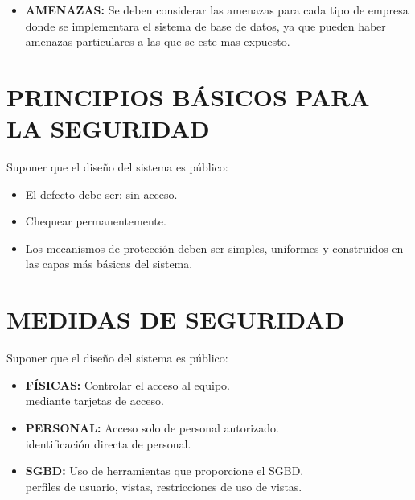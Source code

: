 \documentclass[conference]{IEEEtran}
\begin{document}
\begin{itemize}
\item \textbf{AMENAZAS:} Se deben considerar las amenazas para cada tipo de empresa donde se implementara el sistema de base de datos, ya que pueden haber amenazas particulares a las que se este mas expuesto.
\end{itemize}

\section{PRINCIPIOS BÁSICOS PARA LA SEGURIDAD}

Suponer que el diseño del sistema es público:
\begin{itemize}
\item \textbf{} El defecto debe ser: sin acceso.
\item \textbf{} Chequear permanentemente.
\item \textbf{} Los mecanismos de protección deben ser simples, uniformes y construidos en las capas más básicas del sistema.
\end{itemize}

\section{MEDIDAS DE SEGURIDAD}

Suponer que el diseño del sistema es público:
\begin{itemize}
\item \textbf{FÍSICAS:} Controlar el acceso al equipo.
\\
mediante tarjetas de acceso.
\item \textbf{PERSONAL:} Acceso solo de personal autorizado.
\\
identificación directa de personal.
\item \textbf{SGBD:} Uso de herramientas que proporcione el SGBD.
\\
perfiles de usuario, vistas, restricciones de uso de vistas.
\\
\end{itemize}
\\
\end{document}
